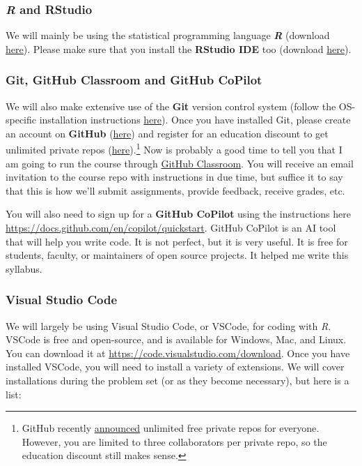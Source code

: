 \documentclass[11pt]{article}
\begin{document}
\vspace{-0.25cm}
\subsubsection*{\textit{R} and RStudio}

We will mainly be using the statistical programming language \textbf{\textit{R}} (download \href{https://www.r-project.org/}{here}). 
Please make sure that you install the \textbf{RStudio IDE} too (download \href{https://www.rstudio.com/products/rstudio/download/preview/}{here}).

\vspace{-0.25cm}
\subsubsection*{Git, GitHub Classroom and GitHub CoPilot}

We will also make extensive use of the \textbf{Git} version control system (follow the OS-specific installation instructions \href{http://happygitwithr.com/install-git.html}{here}). Once you have installed Git, please create an account on \textbf{GitHub} (\href{https://github.com/join}{here}) and register for an education discount to get unlimited private repos (\href{https://education.github.com/discount_requests/new}{here}).\footnote{GitHub recently \href{https://blog.github.com/changelog/2019-01-08-pricing-changes/}{announced} unlimited free private repos for everyone. However, you are limited to three collaborators per private repo, so the education discount still makes sense.} Now is probably a good time to tell you that I am going to run the course through \href{https://classroom.github.com/}{GitHub Classroom}. You will receive an email invitation to the course repo with instructions in due time, but suffice it to say that this is how we'll submit assignments, provide feedback, receive grades, etc.

You will also need to sign up for a \textbf{GitHub CoPilot} using the instructions here \url{https://docs.github.com/en/copilot/quickstart}. GitHub CoPilot is an AI tool that will help you write code. It is not perfect, but it is very useful. It is free for students, faculty, or maintainers of open source projects. It helped me write this syllabus. 

\vspace{-0.25cm}
\subsubsection*{Visual Studio Code}
We will largely be using Visual Studio Code, or VSCode, for coding with \textit{R}. VSCode is free and open-source, and is available for Windows, Mac, and Linux. You can download it at \url{https://code.visualstudio.com/download}. Once you have installed VSCode, you will need to install a variety of extensions. We will cover installations during the problem set (or as they become necessary), but here is a list:
\end{document}
